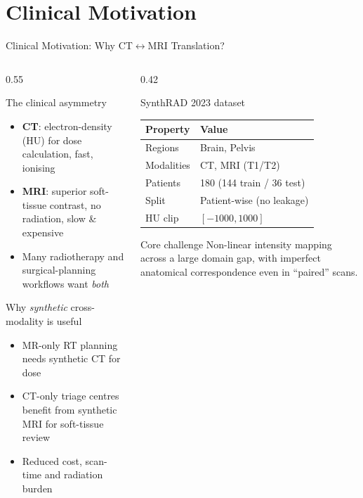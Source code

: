 \documentclass[aspectratio=169,10pt]{beamer}
\begin{document}
\section{Clinical Motivation}
\begin{frame}{Clinical Motivation: Why CT$\leftrightarrow$MRI Translation?}
\begin{columns}[T]
\begin{column}{0.55\textwidth}
\begin{block}{The clinical asymmetry}
\footnotesize
\begin{itemize}
    \item \textbf{CT}: electron-density (HU) for dose calculation, fast, ionising
    \item \textbf{MRI}: superior soft-tissue contrast, no radiation, slow \& expensive
    \item Many radiotherapy and surgical-planning workflows want \emph{both}
\end{itemize}
\end{block}
\begin{exampleblock}{Why \emph{synthetic} cross-modality is useful}
\footnotesize
\begin{itemize}
    \item MR-only RT planning needs synthetic CT for dose
    \item CT-only triage centres benefit from synthetic MRI for soft-tissue review
    \item Reduced cost, scan-time and radiation burden
\end{itemize}
\end{exampleblock}
\end{column}
\begin{column}{0.42\textwidth}
\begin{block}{SynthRAD 2023 dataset}
\footnotesize
\begin{tabular}{ll}
\toprule
\textbf{Property} & \textbf{Value} \\\midrule
Regions      & Brain, Pelvis \\
Modalities   & CT, MRI (T1/T2) \\
Patients     & 180 (144 train / 36 test) \\
Split        & Patient-wise (no leakage) \\
HU clip      & $[-1000, 1000]$ \\
\bottomrule
\end{tabular}
\end{block}
\begin{alertblock}{Core challenge}
\scriptsize
Non-linear intensity mapping across a large domain gap, with imperfect anatomical correspondence even in ``paired'' scans.
\end{alertblock}
\end{column}
\end{columns}
\end{frame}
\end{document}
